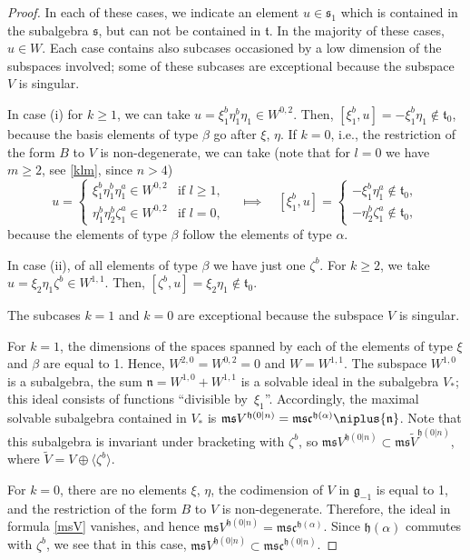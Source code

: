 \documentclass[pdftex]{sigma}
\newcommand {\fc} {{\mathfrak{c}}}
\newcommand {\fg} {{\mathfrak{g}}} %
\newcommand {\fh} {{\mathfrak{h}}}
\newcommand {\fm} {{\mathfrak{m}}}
\newcommand {\fn} {{\mathfrak{n}}}
\newcommand {\fs} {{\mathfrak{s}}}
\newcommand {\ft} {{\mathfrak{t}}}
\newcommand {\<} [2] {{\left.\vphantom{#2}\right.^{#1\!}\!{#2}}}
\numberwithin{equation}{section}
\begin{document}
\begin{proof}
In each of these cases, we indicate an element $u\in \fs_1$ which is contained in the subalgebra $\fs$, but can not be contained in $\ft$. In the majority of these cases, $u\in W$. Each case contains also subcases occasioned by a low dimension of the subspaces involved; some of these subcases are exceptional because the subspace $V$ is singular.

In case (i) for $k\ge 1$, we can take $u=\xi_1^b\eta_1^b \eta_1\in W^{0,2}$. Then, $[\xi_1^b, u]=-\xi_1^b \eta_1\notin \ft_0$, because the basis elements of type $\beta$ go after $\xi$, $\eta$. If $k=0$, i.e., the restriction of the form $B$ to $V$ is non-degenerate, we can take (note that for $l=0$ we have $m\ge 2$, see \eqref{klm}, since $n>4$){\samepage
\[
u=\begin{cases}\xi_1^b\eta_1^b \eta_1^a\in W^{0,2}&\text{if $l\ge 1$},\\
\eta_1^b\eta_2^b\zeta_1^a\in W^{0,2}&\text{if $l=0$,}
\end{cases}\quad \Longmapsto\quad [\xi_1^b, u]=\begin{cases}-\xi_1^b \eta_1^a\notin \ft_0,\\
-\eta_2^b \zeta_1^a\notin \ft_0,\end{cases}
\]
because the elements of type $\beta$ follow the elements of type $\alpha$.}

In case (ii), of all elements of type $\beta$ we have just one $\zeta^b$. For $k\ge 2$, we
 take $u=\xi_2\eta_1\zeta^b\in W^{1,1}$. Then,
$[\zeta^b, u]=\xi_2\eta_1\notin \ft_0$.

The subcases $k=1$ and $k=0$ are exceptional because the subspace $V$ is singular.

For $k=1$, the dimensions of the spaces spanned by each of the elements of type $\xi$ and $\beta$ are equal to 1. Hence, $W^{2,0}=W^{0,2}=0$ and $W=W^{1,1}$. The subspace $W^{1,0}$ is a subalgebra, the sum $\fn= W^{1,0}+W^{1,1}$ is a solvable ideal in the subalgebra $V_*$; this ideal consists of functions ``divisible by~$\xi_1$''. Accordingly, the maximal solvable subalgebra contained in $V_*$ is %
$\fm\fs V^{\fh(0|n)} =\fm\fs\fc^{\fh(\alpha)}\niplus\fn$. Note that this subalgebra is invariant under bracketing with $\zeta^b$, so $\fm\fs V^{\fh(0|n)} \subset\fm\fs \widetilde V^{\fh(0|n)}$, where $\widetilde V=V\oplus \langle\zeta^b\rangle$.

For $k=0$, there are no elements $\xi$, $\eta$, the codimension of $V$ in $\fg_{-1}$ is equal to 1, and the restriction of the form $B$ to $V$ is non-degenerate. Therefore, the ideal in formula \eqref{msV} vanishes, and hence $\fm\fs V^{\fh(0|n)}= \fm\fs\fc^{\fh(\alpha)}$. Since $\fh(\alpha)$ commutes with $\zeta^b$, we see that in this case, $\fm\fs V^{\fh(0|n)}\subset \fm\fs\fc^{\fh(0|n)}$.


\end{proof}
\end{document}
